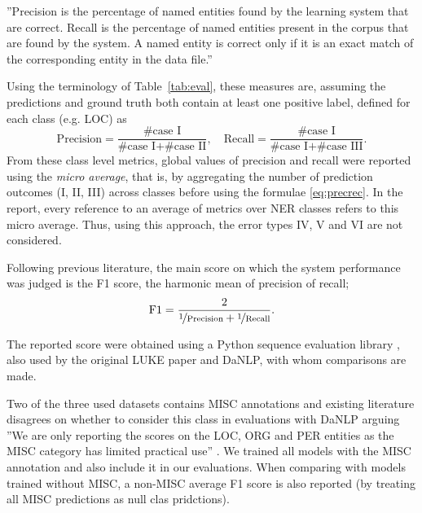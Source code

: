 \documentclass[main.tex]{subfiles}
\begin{document}
''Precision is the percentage of named entities found by the learning system that are correct.
Recall is the percentage of named entities present in the corpus that are found by the system.
A named entity is correct only if it is an exact match of the corresponding entity in the data file.''
\cite[Sec 2.4]{tjang2003conll}

Using the terminology of Table~\ref{tab:eval}, these measures are, assuming the predictions and ground truth both contain at least one positive label, defined for each class (e.g. LOC) as
\begin{equation}
    \label{eq:precrec}
    \text{Precision} = \frac{\text{\# case I}}{\text{\# case I} + \text{\# case II}},\quad \text{Recall} = \frac{\text{\# case I}}{\text{\# case I} + \text{\# case III}}.
\end{equation}
From these class level metrics, global values of precision and recall were reported using the \emph{micro average}, that is, by aggregating the number of prediction outcomes (I, II, III) across classes before using the formulae \eqref{eq:precrec}.
In the report, every reference to an average of metrics over NER classes refers to this micro average.
Thus, using this approach, the error types IV, V and VI are not considered\footnotemark.

Following previous literature, the main score on which the system performance was judged is the F1 score, the harmonic mean of precision of recall;
\begin{equation}
    \label{eq:f1}
    \text{F1} = \dfrac{2}{\nicefrac 1 {\text{Precision}} + \nicefrac 1 {\text{Recall}}}.
\end{equation}

The reported score were obtained using a Python sequence evaluation library \cite{seqeval}, also used by the original LUKE paper and DaNLP, with whom comparisons are made.

Two of the three used datasets contains MISC annotations and existing literature disagrees on whether to consider this class in evaluations with DaNLP arguing
''We are only reporting the scores on the LOC, ORG and PER entities as the MISC category has limited practical use'' \cite[Sec. ''Benchmarks'' in NER page]{danlp2021}.
We trained all models with the MISC annotation and also include it in our evaluations.
When comparing with models trained without MISC, a non-MISC average F1 score is also reported (by treating all MISC predictions as null clas pridctions).
\end{document}
